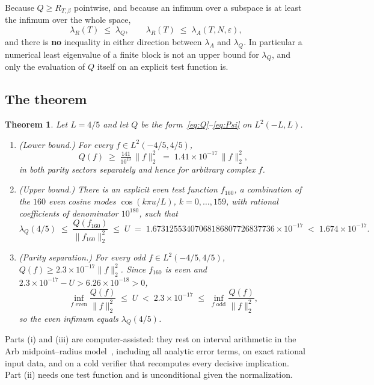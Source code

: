 \documentclass[11pt,a4paper]{article}
\newtheorem{theorem}{Theorem}
\theoremstyle{definition}
\theoremstyle{remark}
\newcommand{\lQ}{\lambda_{Q}}
\newcommand{\lR}{\lambda_{R}}
\newcommand{\lA}{\lambda_{A}}
\begin{document}
\noindent Because $Q \ge R_{T,\beta}$ pointwise, and because an infimum over a
subspace is at least the infimum over the whole space,
\[
   \lR(T) \;\le\; \lQ , \qquad \lR(T) \;\le\; \lA(T,N,\varepsilon) ,
\]
and there is \textbf{no} inequality in either direction between $\lA$ and $\lQ$.
In particular a numerical least eigenvalue of a finite block is not an upper
bound for $\lQ$, and only the evaluation of $Q$ itself on an explicit test
function is.

\subsection{The theorem}

\begin{theorem}
\label{thm:main}
Let $L = 4/5$ and let $Q$ be the form~\eqref{eq:Q}--\eqref{eq:Psi} on
$L^2(-L,L)$.
\begin{enumerate}
\item[(i)] \emph{(Lower bound.)} For every $f \in L^2(-4/5,4/5)$,
  \[
     Q(f) \;\ge\; \tfrac{141}{10^{19}}\, \|f\|_2^2
     \;=\; 1.41\times 10^{-17}\, \|f\|_2^2 ,
  \]
  in both parity sectors separately and hence for arbitrary complex $f$.
\item[(ii)] \emph{(Upper bound.)} There is an explicit even test function
  $f_{160}$, a combination of the $160$ even cosine modes $\cos(k\pi u/L)$,
  $k = 0,\dots,159$, with rational coefficients of denominator $10^{180}$, such
  that
  \[
     \lQ(4/5) \;\le\; \frac{Q(f_{160})}{\|f_{160}\|_2^2}
     \;\le\; U \;=\; 1.67312553407068186807726837736\times10^{-17}
     \;<\; 1.674\times10^{-17}.
  \]
\item[(iii)] \emph{(Parity separation.)} For every odd
  $f \in L^2(-4/5,4/5)$, $Q(f) \ge 2.3\times10^{-17}\|f\|_2^2$. Since
  $f_{160}$ is even and $2.3\times10^{-17} - U > 6.26\times10^{-18} > 0$,
  \[
     \inf_{f \text{ even}} \frac{Q(f)}{\|f\|_2^2} \;\le\; U
     \;<\; 2.3\times10^{-17} \;\le\;
     \inf_{f \text{ odd}} \frac{Q(f)}{\|f\|_2^2} ,
  \]
  so the even infimum equals $\lQ(4/5)$.
\end{enumerate}
\end{theorem}

Parts (i) and (iii) are computer-assisted: they rest on interval arithmetic in
the Arb midpoint--radius model~\cite{Arb}, including all analytic error terms, on exact rational input data, and
on a cold verifier that recomputes every decisive implication. Part (ii) needs
one test function and is unconditional given the normalization.
\end{document}
